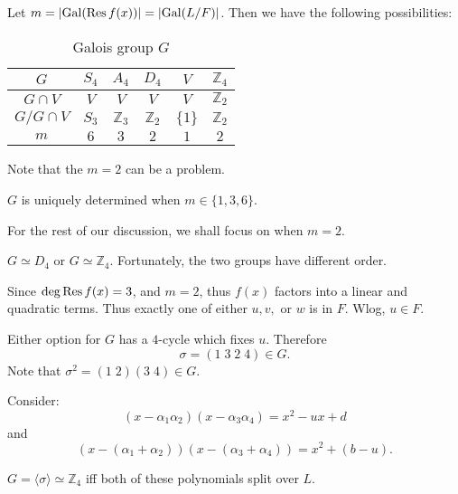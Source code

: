 \documentclass[notoc,notitlepage]{tufte-book}
\DeclareMathOperator{\Gal}{Gal}
\begin{document}
Let $m = \abs{\Gal(\Res f(x))} = \abs{\Gal(L / F)}$. Then we have the following
possibilities:
\begin{table}[ht]
  \centering
  \caption{Galois group $G$}
  \label{table:galois_group_g}
  \begin{tabular}{c | c c c c c}
    $G$ & $S_4$ & $A_4$ & $D_4$ & $V$ & $\mathbb{Z}_4$ \\
    \hline
    $G \cap V$     & $V$   & $V$            & $V$            & $V$       & $\mathbb{Z}_2$ \\
    $G / G \cap V$ & $S_3$ & $\mathbb{Z}_3$ & $\mathbb{Z}_2$ & $\{ 1 \}$ & $\mathbb{Z}_2$ \\
    $m$            & $6$   & $3$            & $2$            & $1$       & $2$
  \end{tabular}
\end{table}
Note that the $m = 2$ can be a problem.

\begin{remark}
  $G$ is uniquely determined when $m \in \{ 1, 3, 6 \}$.
\end{remark}

For the rest of our discussion, we shall focus on when $m = 2$.

 $G \simeq D_4$ or $G \simeq \mathbb{Z}_4$.
Fortunately, the two groups have different order.

Since $\deg \operatorname{Res} f(x) = 3$, and $m = 2$, thus $f(x)$ factors into a linear and
quadratic terms. Thus exactly one of either $u, v,$ or $w$ is in $F$. Wlog, $u
\in F$.

Either option for $G$ has a $4$-cycle which fixes $u$. Therefore
\begin{equation*}
  \sigma = (1 \; 3 \; 2 \; 4) \in G.
\end{equation*}
Note that $\sigma^2 = (1 \; 2)(3 \; 4) \in G$.

Consider:
\begin{equation*}
  (x - \alpha_1 \alpha_2)(x - \alpha_3 \alpha_4) = x^2 - ux + d
\end{equation*}
and
\begin{equation*}
  (x - ( \alpha_1 + \alpha_2 ))(x - (\alpha_3 + \alpha_4)) = x^2 + (b - u).
\end{equation*}

 $G = \langle \sigma \rangle \simeq \mathbb{Z}_4$ iff both of
these polynomials split over $L$.
\end{document}
